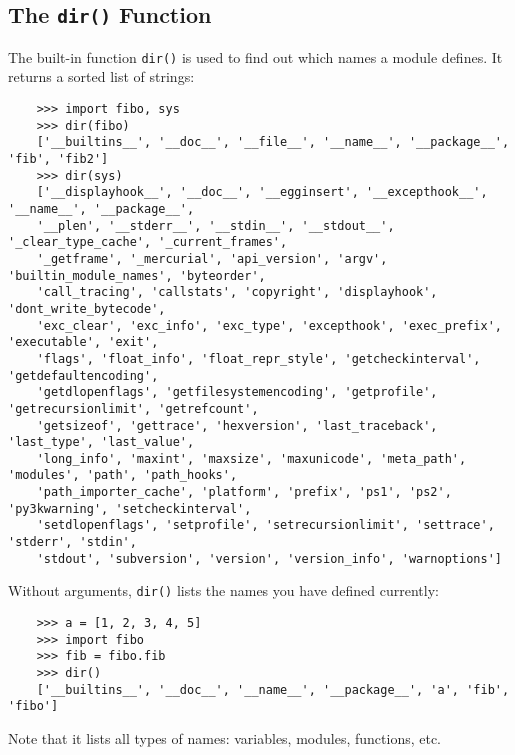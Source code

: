 \documentclass[UTF8]{article}
\begin{document}
\subsection{The \texttt{dir()} Function}
The built-in function \texttt{dir()} is used to find out which names a module defines. It returns a
sorted list of strings:
\begin{verbatim}
    >>> import fibo, sys
    >>> dir(fibo)
    ['__builtins__', '__doc__', '__file__', '__name__', '__package__', 'fib', 'fib2']
    >>> dir(sys)
    ['__displayhook__', '__doc__', '__egginsert', '__excepthook__', '__name__', '__package__',
    '__plen', '__stderr__', '__stdin__', '__stdout__', '_clear_type_cache', '_current_frames',
    '_getframe', '_mercurial', 'api_version', 'argv', 'builtin_module_names', 'byteorder',
    'call_tracing', 'callstats', 'copyright', 'displayhook', 'dont_write_bytecode',
    'exc_clear', 'exc_info', 'exc_type', 'excepthook', 'exec_prefix', 'executable', 'exit',
    'flags', 'float_info', 'float_repr_style', 'getcheckinterval', 'getdefaultencoding',
    'getdlopenflags', 'getfilesystemencoding', 'getprofile', 'getrecursionlimit', 'getrefcount',
    'getsizeof', 'gettrace', 'hexversion', 'last_traceback', 'last_type', 'last_value',
    'long_info', 'maxint', 'maxsize', 'maxunicode', 'meta_path', 'modules', 'path', 'path_hooks',
    'path_importer_cache', 'platform', 'prefix', 'ps1', 'ps2', 'py3kwarning', 'setcheckinterval',
    'setdlopenflags', 'setprofile', 'setrecursionlimit', 'settrace', 'stderr', 'stdin',
    'stdout', 'subversion', 'version', 'version_info', 'warnoptions']
\end{verbatim}

Without arguments, \texttt{dir()} lists the names you have defined currently:
\begin{verbatim}
    >>> a = [1, 2, 3, 4, 5]
    >>> import fibo
    >>> fib = fibo.fib
    >>> dir()
    ['__builtins__', '__doc__', '__name__', '__package__', 'a', 'fib', 'fibo']
\end{verbatim}

Note that it lists all types of names: variables, modules, functions, etc.
\end{document}

